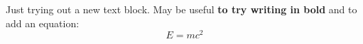 Just trying out a new text block. May be useful \textbf{to try writing in bold} and to add an equation:
\begin{equation}
E = mc^2
\end{equation}
  